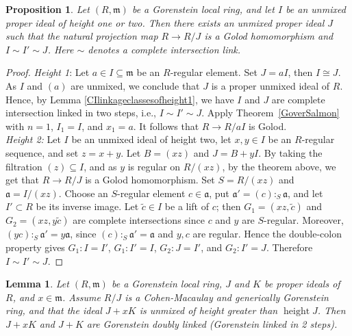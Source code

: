 \documentclass[11pt,letterpaper]{amsart}
\newcommand{\seq}{\subseteq}
\newcommand{\x}{\xrightarrow{}}
\DeclareMathOperator{\height}{height}
\theoremstyle{plain}
\newtheorem{lem}[thm]{Lemma}
\newtheorem{prop}[thm]{Proposition}
\theoremstyle{definition}
\theoremstyle{remark}
\begin{document}
\begin{prop}
    Let $(R,\mathfrak m)$ be a Gorenstein local ring, and let $I$ be an unmixed proper ideal of height one or two. Then there exists an unmixed proper ideal $J$ such that the natural projection map $R\x R/J$ is a Golod homomorphism and $I\sim I'\sim J$. Here $\sim$ denotes a complete intersection link.
\end{prop}
\begin{proof}\emph{Height 1}: Let $a\in I\seq \mathfrak m$ be an $R$-regular element. Set $J=aI$, then $I\cong J$. %
As $I$ and $(a)$ are unmixed, we conclude that $J$ is a proper unmixed ideal of $R$. Hence, by Lemma \ref{CIlinkageclassesofheight1}, we have $I$ and $J$ are complete intersection linked in two steps, i.e., $I\sim I'\sim J$. Apply Theorem~\ref{GoverSalmon} with $n=1$, $I_1=I$, and $x_1=a$. It follows that $R\x R/aI$ is Golod.\\

\emph{Height 2:} Let \(I\) be an unmixed ideal of height two, let \(x,y\in I\) be an \(R\)-regular sequence, and set \(z=x+y\). Let \(B=(xz)\) and \(J=B+yI\). By taking the filtration \((z)\subseteq I\), and as \(y\) is regular on \(R/(xz)\), by the theorem above, we get that \(R\to R/J\) is a Golod homomorphism. Set \(S=R/(xz)\) and \(\mathfrak a=I/(xz)\). Choose an \(S\)-regular element \(c\in\mathfrak a\), put \(\mathfrak a'=(c):_S\mathfrak a\), and let \(I'\subset R\) be its inverse image. Let \(\widetilde c\in I\) be a lift of \(c\); then \(G_1=(xz,\widetilde c)\) and \(G_2=(xz,y\widetilde c)\) are complete intersections since \(c\) and \(y\) are \(S\)-regular. Moreover, \((yc):_S\mathfrak a'=y\mathfrak a\), since \((c):_S\mathfrak a'=\mathfrak a\) and \(y,c\) are regular. Hence the double-colon property gives \(G_1:I=I'\), \(G_1:I'=I\), \(G_2:J=I'\), and \(G_2:I'=J\). Therefore \(I\sim I'\sim J\).
\end{proof}

\begin{lem}\cite[Proposition~4.1]{huneke2007liaison}\label{Gorensteindoublelink} Let $(R,\mathfrak m)$ be a Gorenstein local ring, $J$ and $K$ be proper ideals of $R$, and $x\in\mathfrak m$. Assume $R/J$ is a Cohen-Macaulay and generically Gorenstein ring, and that the ideal $J+xK$ is unmixed of height greater than $\height J$. Then $J+xK$ and $J+K$ are Gorenstein doubly linked (Gorenstein linked in 2 steps).   
\end{lem}
\end{document}
